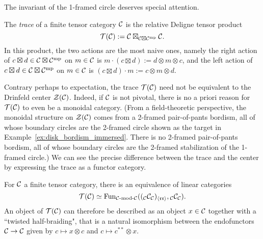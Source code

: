 \documentclass{amsart}
\begin{document}
The invariant of the 1-framed circle deserves special attention.
\begin{definition}
The \emph{trace} of a finite tensor category $\mathcal C$ is the relative Deligne tensor product 
\[
\mathcal T(\mathcal C) := \mathcal C \boxtimes_{\mathcal C \boxtimes \mathcal C^{\mathrm{mp}}} \mathcal C.
\]
In this product, the two actions are the most naive ones, namely the right action of $c \boxtimes d \in \mathcal C \boxtimes \mathcal C^{\mathrm{mp}}$ on $m \in \mathcal C$ is $m \cdot (c \boxtimes d) := d \otimes m \otimes c$, and the left action of $c \boxtimes d \in \mathcal C \boxtimes \mathcal C^{\mathrm{mp}}$ on $m \in \mathcal C$ is $(c \boxtimes d) \cdot m := c \otimes m \otimes d$.
\end{definition}
Contrary perhaps to expectation, the trace $\mathcal T(\mathcal C)$ need not be equivalent to the Drinfeld center $\mathcal Z(\mathcal C)$.  Indeed, if $\mathcal C$ is not pivotal, there is no a priori reason for $\mathcal T(\mathcal C)$ to even be a monoidal category.  (From a field-theoretic perspective, the monoidal structure on $\mathcal Z(\mathcal C)$ comes from a 2-framed pair-of-pants bordism, all of whose boundary circles are the 2-framed circle shown as the target in Example~\ref{ex:disk_bordism_immersed}.  There is no 2-framed pair-of-pants bordism, all of whose boundary circles are the 2-framed stabilization of the 1-framed circle.)  We can see the precise difference between the trace and the center by expressing the trace as a functor category. 
\begin{corollary}
For $\mathcal C$ a finite tensor category, there is an equivalence of linear categories
\[
\cT(\cC) \simeq \Fun_{\mod{\cC}{\cC}}(({}_\cC \cC_\cC)_{\langle \mathfrak{r r} \rangle},{}_\cC \cC_\cC).
\]
An object of $\mathcal T(\mathcal C)$ can therefore be described as an object $x \in \mathcal C$ together with a ``twisted half-braiding", that is a natural isomorphism between the endofunctors $\mathcal C \rightarrow \mathcal C$ given by $c \mapsto x \otimes c$ and $c \mapsto c^{**} \otimes x$.
\end{corollary}
\end{document}
